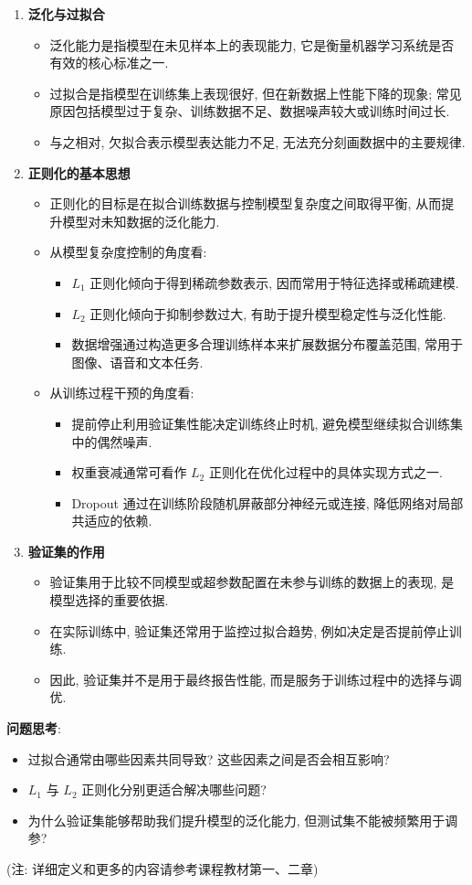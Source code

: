 \documentclass{../nndlcourse}
\begin{document}
\begin{enumerate}
  \item \textbf{泛化与过拟合}
    \begin{itemize}
      \item 泛化能力是指模型在未见样本上的表现能力, 它是衡量机器学习系统是否有效的核心标准之一.
      \item 过拟合是指模型在训练集上表现很好, 但在新数据上性能下降的现象; 常见原因包括模型过于复杂、训练数据不足、数据噪声较大或训练时间过长.
      \item 与之相对, 欠拟合表示模型表达能力不足, 无法充分刻画数据中的主要规律.
    \end{itemize}
  \item \textbf{正则化的基本思想}
    \begin{itemize}
      \item 正则化的目标是在拟合训练数据与控制模型复杂度之间取得平衡, 从而提升模型对未知数据的泛化能力.
      \item 从模型复杂度控制的角度看:
        \begin{itemize}
          \item $L_1$ 正则化倾向于得到稀疏参数表示, 因而常用于特征选择或稀疏建模.
          \item $L_2$ 正则化倾向于抑制参数过大, 有助于提升模型稳定性与泛化性能.
          \item 数据增强通过构造更多合理训练样本来扩展数据分布覆盖范围, 常用于图像、语音和文本任务.
        \end{itemize}
      \item 从训练过程干预的角度看:
        \begin{itemize}
          \item 提前停止利用验证集性能决定训练终止时机, 避免模型继续拟合训练集中的偶然噪声.
          \item 权重衰减通常可看作 $L_2$ 正则化在优化过程中的具体实现方式之一.
          \item Dropout 通过在训练阶段随机屏蔽部分神经元或连接, 降低网络对局部共适应的依赖.
        \end{itemize}
    \end{itemize}
  \item \textbf{验证集的作用}
    \begin{itemize}
      \item 验证集用于比较不同模型或超参数配置在未参与训练的数据上的表现, 是模型选择的重要依据.
      \item 在实际训练中, 验证集还常用于监控过拟合趋势, 例如决定是否提前停止训练.
      \item 因此, 验证集并不是用于最终报告性能, 而是服务于训练过程中的选择与调优.
    \end{itemize}
\end{enumerate}

\textbf{问题思考}: 

\begin{itemize}
  \item 过拟合通常由哪些因素共同导致? 这些因素之间是否会相互影响?
  \item $L_1$ 与 $L_2$ 正则化分别更适合解决哪些问题?
  \item 为什么验证集能够帮助我们提升模型的泛化能力, 但测试集不能被频繁用于调参?
\end{itemize}





(注: 详细定义和更多的内容请参考课程教材第一、二章)
\end{document}
